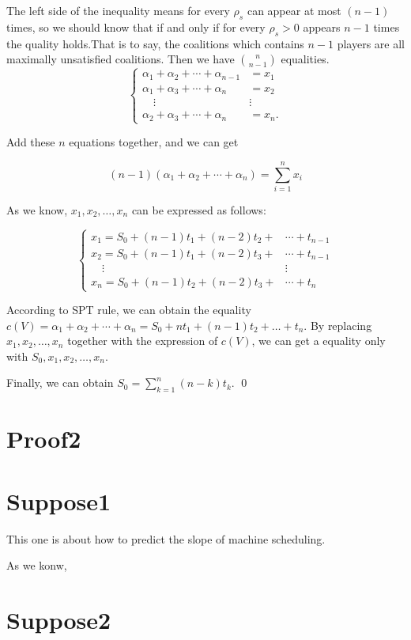 \documentclass[UTF8]{article}
\begin{document}
The left side of the inequality means for every $\rho_s$ can appear at most $(n-1)$ times, so we should know that if and only if for every $\rho_s > 0$ appears $n-1$ times the quality holds.That is to say, the coalitions which contains $n-1$ players are all maximally unsatisfied coalitions. Then we have $n \choose n-1$ equalities.
\[
\begin{cases}
 \alpha_1+\alpha_2+ \cdots+\alpha_{n-1} & = x_1 \\
 \alpha_1+\alpha_3+ \cdots+\alpha_n & = x_2 \\
 \quad   \vdots        &\vdots\\
 \alpha_2+\alpha_3+ \cdots+\alpha_n & = x_n.
\end{cases}
\]

Add these $n$ equations together, and we can get

\begin{equation*}
  (n-1)(\alpha_1+\alpha_2+ \cdots+\alpha_n)=\sum_{i=1}^{n}x_i
\end{equation*}

As we know, $x_1,x_2,\dots,x_n$ can be expressed as follows:

\[
\begin{cases}
x_1 = S_0 + (n-1)t_1 + (n-2)t_2 + &\cdots + t_{n-1} \\
x_2 = S_0 + (n-1)t_1 + (n-2)t_3 + &\cdots + t_{n-1} \\
\quad   \vdots        &\vdots\\
x_n = S_0 + (n-1)t_2 + (n-2)t_3 + &\cdots + t_{n}
\end{cases}
\]

According to SPT rule, we can obtain the equality
$c(V)=\alpha_1+\alpha_2+\cdots+\alpha_n=S_0+nt_1+(n-1)t_2+\dots+t_n$.
By replacing $x_1,x_2,\dots,x_n$ together with the expression of $c(V)$, we can get a equality only with $S_0,x_1,x_2,\dots,x_n$.

Finally, we can obtain $S_0 = \sum_{k=1}^n (n-k)t_k$.
\qed

\section{Proof2}



\section{Suppose1}
This one is about how to predict the slope of machine scheduling.




As we konw,




\section{Suppose2}
\end{document}
